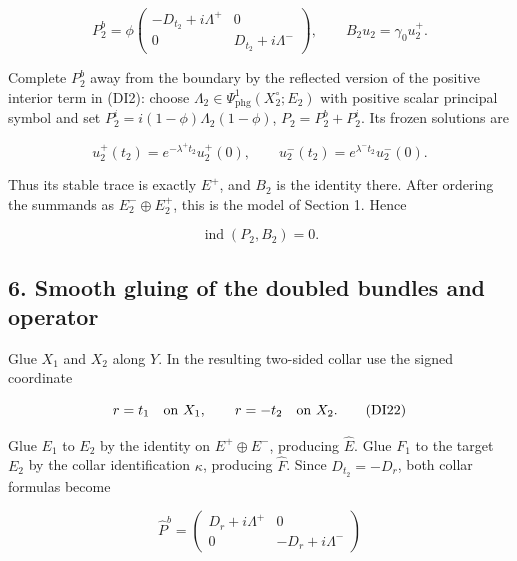 \documentclass[
  11pt,
]{article}
\makeatletter
\let\ReaderOriginalAnchorStart\hyper@anchorstart
\let\ReaderOriginalAnchorEnd\hyper@anchorend
\let\ReaderPendingAliases\@empty
\def\ReaderArmAliases#1{\gdef\ReaderPendingAliases{#1}}
\def\hyper@anchorstart#1{\ReaderIfNativeAnchorTF{#1}{\ReaderPendingAliases\global\let\ReaderPendingAliases\@empty}{}\ReaderOriginalAnchorStart{#1}}
\makeatother
\begin{document}
\[
 P_2^b=\phi
 \begin{pmatrix}
  -D_{t_2}+i\Lambda^+&0\\
  0&D_{t_2}+i\Lambda^-
 \end{pmatrix},\qquad
 B_2u_2=\gamma_0u_2^+.
 \tag{DI19}
\]

Complete \(P_2^b\) away from the boundary by the reflected version of
the positive interior term in (DI2): choose
\(\Lambda_2\in\Psi_{\mathrm{phg}}^1(X_2^\circ;E_2)\) with positive
scalar principal symbol and set \(P_2^i=i(1-\phi)\Lambda_2(1-\phi)\),
\(P_2=P_2^b+P_2^i\). Its frozen solutions are

\[
 u_2^+(t_2)=e^{-\lambda^+t_2}u_2^+(0),\qquad
 u_2^-(t_2)=e^{\lambda^-t_2}u_2^-(0).
 \tag{DI20}
\]

Thus its stable trace is exactly \(E^+\), and \(B_2\) is the identity
there. After ordering the summands as \(E_2^-\oplus E_2^+\), this is the
model of Section 1. Hence

\[
 \operatorname{ind}(P_2,B_2)=0.
 \tag{DI21}
\]

\ReaderArmAliases{\ReaderOriginalAnchorStart{AN03-SDI-006}\ReaderOriginalAnchorEnd\begingroup\expandafter\def\csname @currentHref\endcsname{AN03-SDI-006}\label{AN03-SDI-006}\endgroup\ReaderOriginalAnchorStart{6-smooth-gluing-of-the-doubled-bundles-and-operator}\ReaderOriginalAnchorEnd\begingroup\expandafter\def\csname @currentHref\endcsname{6-smooth-gluing-of-the-doubled-bundles-and-operator}\label{6-smooth-gluing-of-the-doubled-bundles-and-operator}\endgroup\ReaderOriginalAnchorStart{smooth-gluing-of-the-doubled-bundles-and-operator}\ReaderOriginalAnchorEnd}
\subsection{6. Smooth gluing of the doubled bundles and
operator}\label{smooth-gluing-of-the-doubled-bundles-and-operator}

Glue \(X_1\) and \(X_2\) along \(Y\). In the resulting two-sided collar
use the signed coordinate

\[
 r=t_1\quad\hbox{on }X_1,\qquad
 r=-t_2\quad\hbox{on }X_2.
 \tag{DI22}
\]

Glue \(E_1\) to \(E_2\) by the identity on \(E^+\oplus E^-\), producing
\(\widehat E\). Glue \(F_1\) to the target \(E_2\) by the collar
identification \(\kappa\), producing \(\widehat F\). Since
\(D_{t_2}=-D_r\), both collar formulas become

\[
 \widehat P^b=
 \begin{pmatrix}
  D_r+i\Lambda^+&0\\
 0&-D_r+i\Lambda^-
 \end{pmatrix}
 \tag{DI23}
\]
\end{document}

